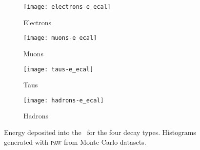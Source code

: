\begin{figure}
    \centering
    \begin{subfigure}[c]{0.48\linewidth}
        \centering
        \texttt{[image: electrons-e\_ecal]}
        \caption{%
            Electrons
        }
        \label{fig:paw-e_ecal/electrons}
    \end{subfigure}
    \hfill
    \begin{subfigure}[c]{0.48\linewidth}
        \centering
        \texttt{[image: muons-e\_ecal]}
        \caption{%
            Muons
        }
        \label{fig:paw-e_ecal/muons}
    \end{subfigure}

    \vspace{2ex}

    \begin{subfigure}[c]{0.48\linewidth}
        \centering
        \texttt{[image: taus-e\_ecal]}
        \caption{%
            Taus
        }
        \label{fig:paw-e_ecal/taus}
    \end{subfigure}
    \hfill
    \begin{subfigure}[c]{0.48\linewidth}
        \centering
        \texttt{[image: hadrons-e\_ecal]}
        \caption{%
            Hadrons
        }
        \label{fig:paw-e_ecal/hadrons}
    \end{subfigure}
    \caption{%
        Energy deposited into the \eecal\ for the four decay types.
        Histograms generated with \textsc{paw} from Monte Carlo datasets.
    }
    \label{fig:paw-e_ecal}
\end{figure}
